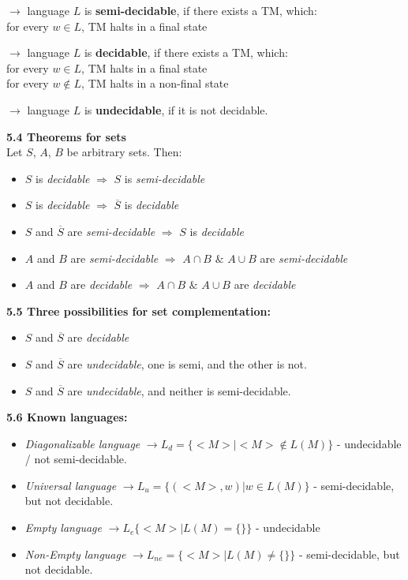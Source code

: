 \documentclass{article}
\begin{document}
\begin{multicols}{2}
$\rightarrow$ language $L$ is \textbf{semi-decidable}, if there exists a TM, which:\\
    for every $w \in L$, TM halts in a final state

$\rightarrow$ language $L$ is \textbf{decidable}, if there exists a TM, which:\\
    for every $w \in L$, TM halts in a final state\\
    for every $w \notin L$, TM halts in a non-final state


$\rightarrow$ language $L$ is \textbf{undecidable}, if it is not decidable.

\textbf{5.4 Theorems for sets}\\
Let $S$, $A$, $B$ be arbitrary sets. Then:
\begin{itemize}
    \setlength\itemsep{-0.4em}
    \item $S$ is \textit{decidable} $\Rightarrow$ $S$ is \textit{semi-decidable}
    \item $S$ is \textit{decidable} $\Rightarrow$ $\overline{S}$ is \textit{decidable}
    \item $S$ and $\overline{S}$ are \textit{semi-decidable} $\Rightarrow$ $S$ is \textit{decidable}
    \item $A$ and $B$ are \textit{semi-decidable} $\Rightarrow$ $A \cap B $ $\&$ $A \cup B$ are \textit{semi-decidable}
    \item $A$ and $B$ are \textit{decidable} $\Rightarrow$ $A \cap B $ $\&$ $A \cup B$ are \textit{decidable}
\end{itemize}

\textbf{5.5 Three possibilities for set complementation:}
\begin{itemize}
    \setlength\itemsep{-0.2em}
    \item $S$ and $\overline{S}$ are \textit{decidable}
    \item $S$ and $\overline{S}$ are \textit{undecidable}, one is semi, and the other is not.
    \item $S$ and $\overline{S}$ are \textit{undecidable}, and neither is semi-decidable.
\end{itemize}

\textbf{5.6 Known languages:}\\
\begin{itemize}
    \setlength\itemsep{-0.2em}
    \item \textit{Diagonalizable language} $\rightarrow L_d = \{<M >| <M> \notin L(M)\}$ - undecidable / not semi-decidable.
    \item \textit{Universal language} $\rightarrow L_u = \{(<M>, w) | w \in L(M)\}$ - semi-decidable, but not decidable.
    \item \textit{Empty language} $\rightarrow L_e \{<M> | L(M) = \{\}\}$ - undecidable
    \item \textit{Non-Empty language} $\rightarrow L_{ne} = \{<M> | L(M) \neq \{\}\}$ - semi-decidable, but not decidable.
\end{itemize}


\end{multicols}
\end{document}
